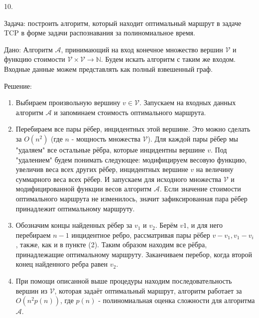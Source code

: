 \documentclass[12pt]{article}
\begin{document}
10. 

Задача: построить алгоритм, который находит оптимальный маршрут в задаче TCP 
в форме задачи распознавания за полиномиальное время.

Дано: Алгоритм $\mathcal{A}$, принимающий на вход конечное множество вершин $\mathcal{V}$ и функцию
стоимости $\mathcal{V} \times \mathcal{V} \rightarrow \mathbb{N}$. Будем искать алгоритм с таким же 
входом. Входные данные можем представлять как полный взвешенный граф.

Решение:
\begin{enumerate}
    \item Выбираем произвольную вершину $v \in \mathcal{V}$. Запускаем на входных данных алгоритм 
        $\mathcal{A}$ и запоминаем стоимость оптимального маршрута.
    \item Перебираем все пары рёбер, инцидентных этой вершине. Это можно сделать за $O(n^2)$ (где $n$
        - мощность множества $\mathcal{V}$). Для каждой пары рёбер мы "удаляем" все остальные рёбра,
        которые инцидентны вершине $v$. Под "удалением" будем понимать следующее: модифицируем весовую
        функцию, увеличив веса всех других рёбер, инцидентных вершине $v$ на величину суммарного веса
        всех рёбер. И запускаем для исходного множества $\mathcal{V}$ и модифицированной функции
        весов алгоритм $\mathcal{A}$. Если значение стоимости оптимального маршрута не 
        изменилось, значит зафиксированная пара рёбер принадлежит оптимальному маршруту. 
    \item Обозначим концы найденных рёбер за $v_1$ и $v_2$. Берём $v1$, и для него перебираем $n - 1$
        инцидентное ребро, рассматривая пары рёбер $v - v_1, v_1 - v_i$, также, как и в пункте (2).
        Таким образом находим все рёбра, принадлежащие оптимальному маршруту. Заканчиваем перебор,
        когда второй конец найденного ребра равен $v_2$. 
    \item При помощи описанной выше процедуры находим последовательность вершин из $\mathcal{V}$, 
        которая задаёт оптимальный маршрут, алгоритм работает за $O(n^2p(n))$, где $p(n)$ -
        полиномиальная оценка сложности для алгоритма $\mathcal{A}$.
\end{enumerate}
\end{document}
